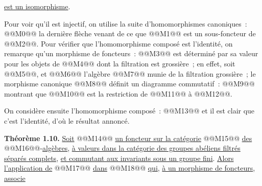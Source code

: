 
\uline{est un
isomorphisme}.

Pour voir qu'il est injectif, on utilise la suite d'homomorphismes canoniques~:
@@M0@@
la dernière flèche venant de ce que @@M1@@ est un sous-foncteur de @@M2@@. Pour vérifier que l'homomorphisme composé est l'identité, on remarque qu'un morphisme de foncteurs~: @@M3@@ est déterminé par sa valeur pour les objets de @@M4@@ dont la filtration est grossière~; en effet, soit @@M5@@, et @@M6@@ l'algèbre @@M7@@ munie de la filtration grossière~; le morphisme canonique @@M8@@ définit un diagramme commutatif~:
@@M9@@
montrant que @@M10@@ est la restriction de @@M11@@ à @@M12@@.

On considère ensuite l'homomorphisme composé~:
@@M13@@
et il est clair que c'est l'identité, d'où le résultat annoncé.

\textbf{Théorème 1.10.} \uline{Soit} @@M14@@ \uline{un foncteur sur la catégorie} @@M15@@ \uline{des} @@M16@@-\uline{algèbres}, \uline{à valeurs dans la catégorie des groupes abéliens filtrés séparés complets}, \uline{et commutant aux invariants sous un groupe fini}. \uline{Alors l'application de} @@M17@@ \uline{dans} @@M18@@ \uline{qui}, \uline{à un morphisme de foncteurs}, \uline{associe}
